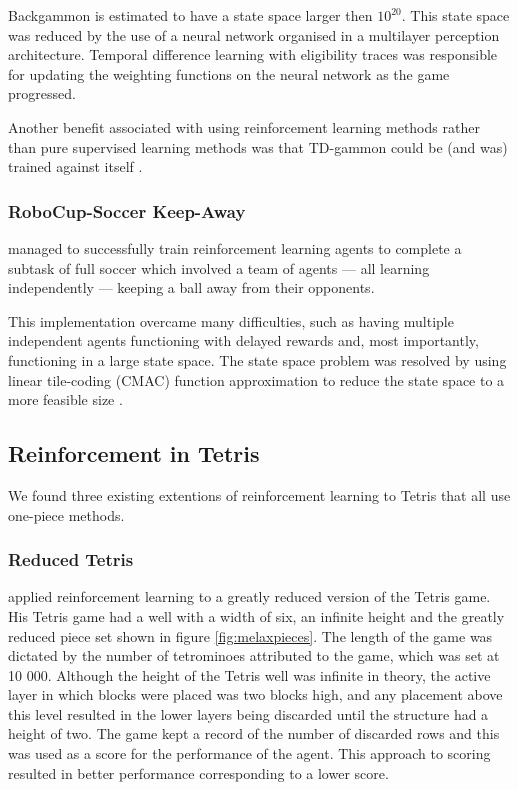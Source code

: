 \documentclass{rucsthesis}
\begin{document}
Backgammon is estimated to have a state space larger then $10^{20}$. This state space was reduced by the use of a neural network organised in a multilayer perception architecture. Temporal difference learning with eligibility traces was responsible for updating the weighting functions on the neural network as the game progressed. 

Another benefit associated with using reinforcement learning methods rather than pure supervised learning methods was that TD-gammon could be (and was) trained against itself \citep{tdgammon}.

\subsubsection{RoboCup-Soccer Keep-Away}

\cite{keepaway} managed to successfully train reinforcement learning agents to complete a subtask of full soccer which involved a team of agents --- all learning independently --- keeping a ball away from their opponents. 

This implementation overcame many difficulties, such as having multiple independent agents functioning with delayed rewards and, most importantly, functioning in a large state space. The state space problem was resolved by using linear tile-coding (CMAC) function approximation to reduce the state space to a more feasible size \citep{keepaway}.

\subsection{Reinforcement in Tetris}

We found three existing extentions of reinforcement learning to Tetris that all use one-piece methods.

\subsubsection{Reduced Tetris}

\cite{melaxtetris} applied reinforcement learning to a greatly reduced version of the Tetris game. His Tetris game had a well with a width of six, an infinite height and the greatly reduced piece set shown in figure \ref{fig:melaxpieces}. The length of the game was dictated by the number of tetrominoes attributed to the game, which was set at 10 000. Although the height of the Tetris well was infinite in theory, the active layer in which blocks were placed was two blocks high, and any placement above this level resulted in the lower layers being discarded until the structure had a height of two. The game kept a record of the number of discarded rows and this was used as a score for the performance of the agent. This approach to scoring resulted in better performance corresponding to a lower score. 
\end{document}

